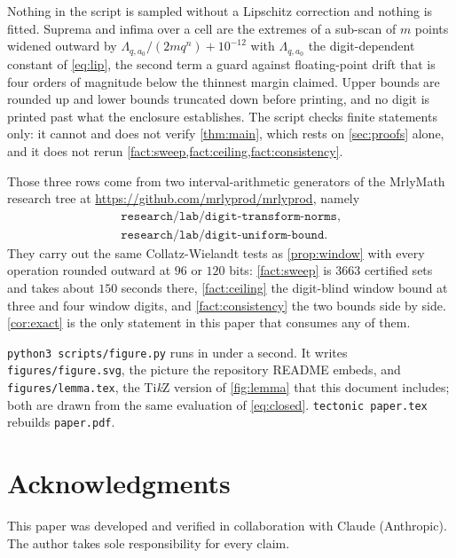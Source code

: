 \documentclass[11pt]{amsart}
\theoremstyle{definition}
\theoremstyle{remark}
\begin{document}
Nothing in the script is sampled without a Lipschitz correction and nothing is fitted. Suprema and infima over a cell are the extremes of a sub-scan of $m$ points widened outward by $\Lambda_{q,a_{0}}/(2mq^{n}) + 10^{-12}$ with $\Lambda_{q,a_{0}}$ the digit-dependent constant of \cref{eq:lip}, the second term a guard against floating-point drift that is four orders of magnitude below the thinnest margin claimed. Upper bounds are rounded up and lower bounds truncated down before printing, and no digit is printed past what the enclosure establishes. The script checks finite statements only: it cannot and does not verify \cref{thm:main}, which rests on \cref{sec:proofs} alone, and it does not rerun \cref{fact:sweep,fact:ceiling,fact:consistency}.

Those three rows come from two interval-arithmetic generators of the MrlyMath research tree at \url{https://github.com/mrlyprod/mrlyprod}, namely
\begin{gather*}
  \texttt{research/lab/digit-transform-norms}, \\
  \texttt{research/lab/digit-uniform-bound}.
\end{gather*}
They carry out the same Collatz-Wielandt tests as \cref{prop:window} with every operation rounded outward at $96$ or $120$ bits: \cref{fact:sweep} is $3663$ certified sets and takes about $150$ seconds there, \cref{fact:ceiling} the digit-blind window bound at three and four window digits, and \cref{fact:consistency} the two bounds side by side. \cref{cor:exact} is the only statement in this paper that consumes any of them.

\begin{sloppypar}
\texttt{python3 scripts/figure.py} runs in under a second. It writes \texttt{figures/figure.svg}, the picture the repository README embeds, and \texttt{figures/lemma.tex}, the Ti\emph{k}Z version of \cref{fig:lemma} that this document includes; both are drawn from the same evaluation of \cref{eq:closed}. \texttt{tectonic paper.tex} rebuilds \texttt{paper.pdf}.
\end{sloppypar}

\section*{Acknowledgments}

This paper was developed and verified in collaboration with Claude (Anthropic). The author takes sole responsibility for every claim.
\end{document}
